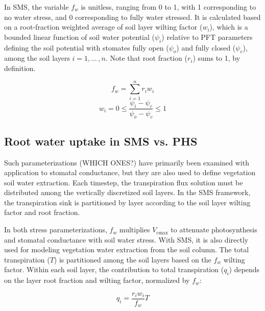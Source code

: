 \documentclass[draft,linenumbers]{agujournal}
\begin{document}
    In SMS, the variable $f_w$ is unitless, ranging from 0 to 1, with 1 corresponding to no water stress, and 0 corresponding to fully water stressed. It is calculated based on a root-fraction weighted average of soil layer wilting factor ($w_i$), which is a bounded linear function of soil water potential ($\psi_i$) relative to PFT parameters defining the soil potential with stomates fully open ($\psi_{o}$) and fully closed ($\psi_{c}$), among the soil layers $i=1,...\,,n$. Note that root fraction ($r_i$) sums to 1, by definition.
    
    \begin{linenomath*}
    \begin{equation} f_w = \sum_{i=1}^{n}{r_iw_i}
    \label{bt:1}
    \end{equation}
    \begin{equation} 
    \label{bt:2}
    w_i=0 \leq \dfrac{\psi_i-\psi_{c}}{\psi_{o}-\psi_{c}} \leq 1
    \end{equation}
    \end{linenomath*}
    

\subsection{Root water uptake in SMS vs. PHS}
    Such parameterizations (WHICH ONES?) have primarily been examined with application to stomatal conductance, but they are also used to define vegetation soil water extraction. Each timestep, the transpiration flux solution must be distributed among the vertically discretized soil layers. In the SMS framework, the transpiration sink is partitioned by layer according to the soil layer wilting factor and root fraction. 
    
    In both stress parameterizations, $f_w$ multiplies $V_{\text{cmax}}$ to attenuate photosynthesis and stomatal conductance with soil water stress. With SMS, it is also directly used for modeling vegetation water extraction from the soil column. The total transpiration ($T$) is partitioned among the soil layers based on the $f_w$ wilting factor. Within each soil layer, the contribution to total transpiration ($q_i$) depends on the layer root fraction and wilting factor, normalized by $f_w$:

    \begin{linenomath*}
    \begin{equation}
    \label{bt:4}
    q_i = \dfrac{r_i w_i}{f_w}T
    \end{equation}
    \end{linenomath*}
    
\end{document}

